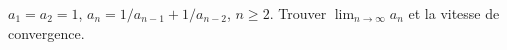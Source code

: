 $a_1 = a_2 = 1$, $a_n = 1/a_{n-1} + 1/a_{n-2}$, $n \geq 2$. Trouver $\lim_{n\to\infty} a_n$ et la vitesse de convergence.
